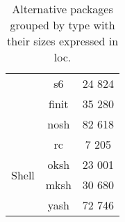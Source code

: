\begin{table}[!ht]
\begin{tabular}{|c|c|c|}
        \cline{2-3}
        & s6 \cite{s6} & 24 824 \\
        \cline{2-3}
        & finit \cite{finit} & 35 280 \\
        \cline{2-3}
        & nosh \cite{nosh} & 82 618 \\ %
        \hline
        \hline
        \multirow{4}{*}{Shell}
        & rc \cite{rc} & 7 205 \\
        \cline{2-3}
        & oksh \cite{oksh} & 23 001 \\
        \cline{2-3}
        & mksh \cite{mksh} & 30 680 \\
        \cline{2-3}
        & yash \cite{yash} & 72 746 \\
        \hline
    \end{tabular}
    \caption{Alternative packages grouped by type with their sizes expressed in \gls{loc}.}
\end{table}


\newpage

